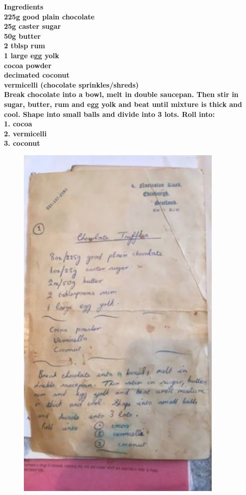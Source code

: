 \documentclass[18pt, oneside]{book}
\begin{document}
\bf{Ingredients} \normalfont \\ 
225g good plain chocolate \\
25g caster sugar \\
50g butter \\
2 tblsp rum \\ 
1 large egg yolk \\
cocoa powder \\
decimated coconut \\
vermicelli (chocolate sprinkles/shreds) \\

Break chocolate into a bowl, melt in double saucepan. Then stir in sugar, butter, rum and egg yolk and beat until mixture is thick and cool. Shape into small balls and divide into 3 lots. Roll into: \\

1. cocoa \\
2. vermicelli \\
3. coconut \\

\begin{figure}[h!]
  \begin{center}
  \includegraphics[width = 10cm]{Picture1.png}
  \end{center}
\end{figure}
\end{document}
